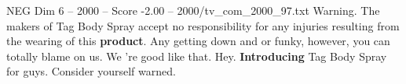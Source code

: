 \begin{textsample}{NEG Dim 6 – 2000 – Score -2.00 – 2000/tv\_com\_2000\_97.txt}  \label{ex:f6_neg_001}
Warning.
The makers of Tag Body Spray accept no responsibility for any injuries resulting from the wearing of this \textbf{product}.
Any getting down and or funky, however, you can totally blame on us.
We 're good like that.
Hey. \textbf{Introducing} Tag Body Spray for guys.
Consider yourself warned.

\end{textsample}
